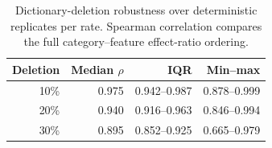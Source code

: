 \begin{table}[t]
\centering
\small
\setlength{\tabcolsep}{3pt}
\begin{tabular}{rrrr}
\toprule
Deletion & Median $\rho$ & IQR & Min--max \\
\midrule
10\% & 0.975 & 0.942--0.987 & 0.878--0.999 \\
20\% & 0.940 & 0.916--0.963 & 0.846--0.994 \\
30\% & 0.895 & 0.852--0.925 & 0.665--0.979 \\
\bottomrule
\end{tabular}
\caption{Dictionary-deletion robustness over \RobustnessReplicates{} deterministic replicates per rate. Spearman correlation compares the full category--feature effect-ratio ordering.}
\label{tab:robustness}
\end{table}
